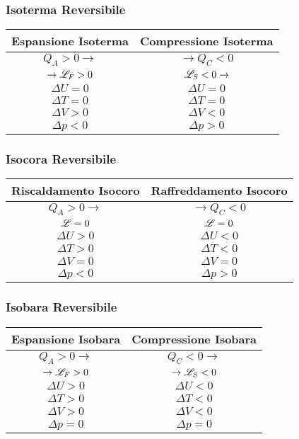 \subsubsection{Isoterma Reversibile}
\begin{center}
\begin{tabular}{| c | c |}
    \hline
    \textbf{Espansione Isoterma} & \textbf{Compressione Isoterma} \\
    \hline
    $Q_A > 0 \to$ & $\to Q_C < 0$ \\
    $\to \mathscr{L}_F > 0$ & $ \mathscr{L}_S < 0 \to$ \\
    \hline
    $\Delta U = 0$ & $\Delta U = 0$\\
    $\Delta T = 0$ & $\Delta T = 0$\\
    $\Delta V > 0$ & $\Delta V < 0$\\
    $\Delta p < 0$ & $\Delta p > 0$\\
    \hline
\end{tabular}
\end{center}

\subsubsection{Isocora Reversibile}
\begin{center}
\begin{tabular}{| c | c |}
    \hline
    \textbf{Riscaldamento Isocoro} & \textbf{Raffreddamento Isocoro} \\
    \hline
    $Q_A > 0 \to$ & $\to Q_C < 0$ \\
    \hline
    $\mathscr{L} = 0$ & $\mathscr{L} = 0$ \\
    $\Delta U > 0$ & $\Delta U < 0$\\
    $\Delta T > 0$ & $\Delta T < 0$\\
    $\Delta V = 0$ & $\Delta V = 0$\\
    $\Delta p < 0$ & $\Delta p > 0$\\
    \hline
\end{tabular}
\end{center}

\subsubsection{Isobara Reversibile}
\begin{center}
\begin{tabular}{| c | c |}
    \hline
    \textbf{Espansione Isobara} & \textbf{Compressione Isobara} \\
    \hline
    $Q_A > 0 \to$ & $Q_C < 0 \to$ \\
    $\to \mathscr{L}_F > 0$ & $ \to\mathscr{L}_S < 0$ \\
    \hline
    $\Delta U > 0$ & $\Delta U < 0$\\
    $\Delta T > 0$ & $\Delta T < 0$\\
    $\Delta V > 0$ & $\Delta V < 0$\\
    $\Delta p = 0$ & $\Delta p = 0$\\
    \hline
\end{tabular}
\end{center}

